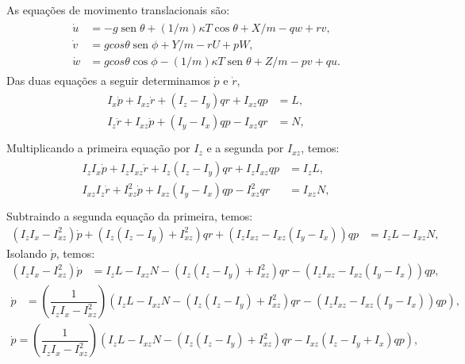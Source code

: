\documentclass[12pt,a4paper]{article}
\DeclareMathOperator{\sen}{sen}
\begin{document}
As equações de movimento translacionais são:
\begin{align}
  \begin{split}
    \dot{u} &= - g\sen\theta + (1/m)\kappa T \cos\theta + X/m - qw + rv,\\
    \dot{v} &= g cos\theta \sen\phi + Y/m - rU + pW ,\\
    \dot{w} &= g cos\theta \cos\phi - (1/m)\kappa T \sen\theta + Z/m  - pv + qu.
  \end{split}
  \label{eq:boeing747-translationsla-dynamics}
\end{align}
Das duas equações a seguir determinamos $\dot{p}$ e $\dot{r}$,
\begin{align}
    \begin{split}
       I_x \dot{p} + I_{xz} \dot{r} + (I_z - I_y)qr + I_{xz}qp &= L,\\
       I_z \dot{r} + I_{xz} \dot{p} + (I_y - I_x)qp - I_{xz}qr &= N,\\
    \end{split}
    \label{eq:pr_acopladas}
\end{align}
Multiplicando a primeira equação por $I_z$ e a segunda por $I_{xz}$, temos:
\begin{align*}
    \begin{split}
        I_zI_x \dot{p} + I_zI_{xz} \dot{r} + I_z(I_z - I_y)qr + I_zI_{xz}qp &= I_zL,\\
        I_{xz}I_z \dot{r} + I_{xz}^2 \dot{p} + I_{xz}(I_y - I_x)qp - I_{xz}^2qr &=I_{xz}N,\\
    \end{split}
\end{align*}
Subtraindo a segunda equação da primeira, temos:
\begin{align*}
         (I_zI_x - I_{xz}^2) \dot{p} + (I_z(I_z - I_y) + I_{xz}^2)qr + (I_zI_{xz} - I_{xz}(I_y - I_x))qp &= I_zL - I_{xz}N,
\end{align*}
Isolando $\dot{p}$, temos:
\begin{align*}
         (I_zI_x - I_{xz}^2) \dot{p} &= I_zL - I_{xz}N - (I_z(I_z - I_y) + I_{xz}^2)qr - (I_zI_{xz} - I_{xz}(I_y - I_x))qp,
\end{align*}
\begin{align*}
         \dot{p} &=\left(\dfrac{1}{I_zI_x - I_{xz}^2}\right)\left( I_zL - I_{xz}N - (I_z(I_z - I_y) + I_{xz}^2)qr - (I_zI_{xz} - I_{xz}(I_y - I_x))qp\right),
\end{align*}
\begin{align*}
    \boxed{\dot{p} =\left(\dfrac{1}{I_zI_x - I_{xz}^2}\right)\left( I_zL - I_{xz}N - (I_z(I_z - I_y) + I_{xz}^2)qr - I_{xz}(I_z -I_y + I_x)qp\right)},
\end{align*}
\end{document}
